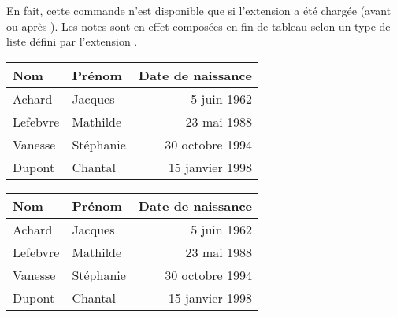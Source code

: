 \documentclass[dvipsnames]{article}%
\begin{document}
En fait, cette commande n'est disponible que si l'extension  a été
chargée (avant ou après ). Les notes sont en effet composées en
fin de tableau selon un type de liste défini par l'extension .

\begin{Code}
\begin{NiceTabular}{@{}llr@{}}
\toprule \RowStyle{\bfseries}
Nom & Prénom & Date de naissance \\
\midrule
Achard\emph{}
& Jacques & 5 juin 1962 \\
Lefebvre\emph{}
& Mathilde & 23 mai 1988 \\
Vanesse & Stéphanie & 30 octobre 1994 \\
Dupont & Chantal & 15 janvier 1998 \\
\bottomrule
\end{NiceTabular}
\end{Code}

\begin{center}
\begin{NiceTabular}{@{}llr@{}}
\toprule \RowStyle{\bfseries}
Nom & Prénom & Date de naissance \\
\midrule
Achard
& Jacques & 5 juin 1962 \\
Lefebvre
& Mathilde & 23 mai 1988 \\
Vanesse & Stéphanie & 30 octobre 1994 \\
Dupont & Chantal & 15 janvier 1998 \\
\bottomrule
\end{NiceTabular}
\end{center}
\end{document}
